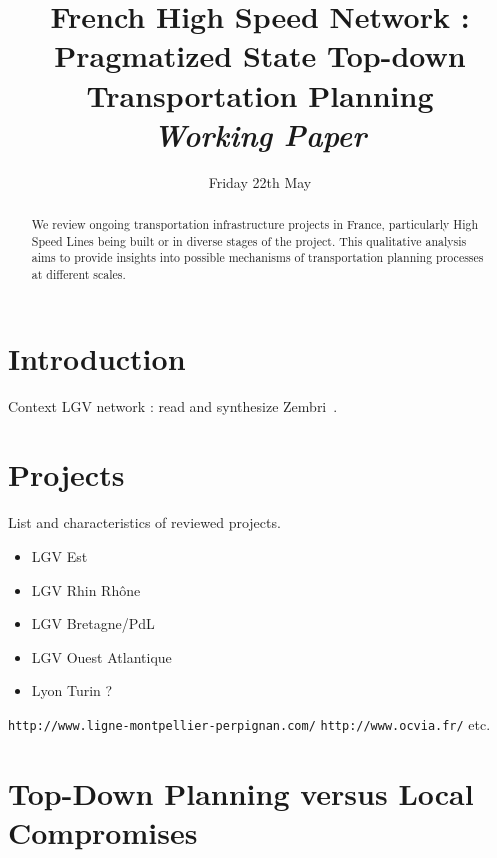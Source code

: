 


\title{French High Speed Network : Pragmatized State Top-down Transportation Planning\bigskip\\
\textit{Working Paper}
}
\author{}
\date{Friday 22th May}


\maketitle

\justify


\begin{abstract}
We review ongoing transportation infrastructure projects in France, particularly High Speed Lines being built or in diverse stages of the project. This qualitative analysis aims to provide insights into possible mechanisms of transportation planning processes at different scales.
\end{abstract}


\section{Introduction}

Context LGV network : read and synthesize Zembri~\cite{zembri1997fondements,zembri2008contribution}.


\section{Projects}

List and characteristics of reviewed projects.

\begin{itemize}
\item LGV Est
\item LGV Rhin Rhône
\item LGV Bretagne/PdL
\item LGV Ouest Atlantique
\item Lyon Turin ?
\end{itemize}

\texttt{http://www.ligne-montpellier-perpignan.com/}
\texttt{http://www.ocvia.fr/}
etc.


\section{Top-Down Planning versus Local Compromises}

